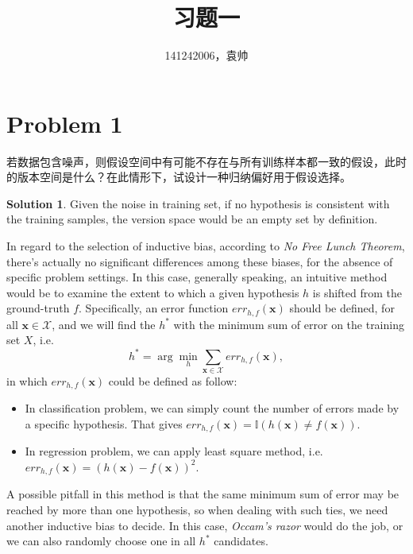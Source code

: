 \documentclass[a4paper,UTF8]{article}
\theoremstyle{definition}
\newtheorem*{solution}{Solution}
\begin{document}
\title{习题一}
\author{141242006，袁帅}
\maketitle


\section*{Problem 1}
若数据包含噪声，则假设空间中有可能不存在与所有训练样本都一致的假设，此时的版本空间是什么？在此情形下，试设计一种归纳偏好用于假设选择。
\begin{solution}
Given the noise in training set, if no hypothesis is consistent with the training samples, the version space would be an empty set by definition.

In regard to the selection of inductive bias, according to \textit{No Free Lunch Theorem}, there's actually no significant differences among these biases, for the absence of specific problem settings. In this case, generally speaking, an intuitive method would be to examine the extent to which a given hypothesis $h$ is shifted from the ground-truth $f$. Specifically, an error function $err_{h,f}(\bm{x})$ should be defined, for all $\bm{x}\in\mathcal{X}$, and we will find the $h^*$ with the minimum sum of error on the training set $X$, i.e. 
\begin{equation}
h^*=\arg\min_{h}\sum_{\bm{x}\in\mathcal{X}}err_{h,f}(\bm{x}),
\end{equation}
in which $err_{h,f}(\bm{x})$ could be defined as follow:

\begin{itemize}
\item{In classification problem, we can simply count the number of errors made by a specific hypothesis. That gives $err_{h,f}(\bm{x})=\mathbb{I}(h(\bm{x})\neq f(\bm{x}))$.}
\item{In regression problem, we can apply least square method, i.e. $err_{h,f}(\bm{x})=(h(\bm{x})-f(\bm{x}))^2$.}
\end{itemize}

A possible pitfall in this method is that the same minimum sum of error may be reached by more than one hypothesis, so when dealing with such ties, we need another inductive bias to decide. In this case, \textit{Occam's razor} would do the job, or we can also randomly choose one in all $h^*$ candidates.

~\\
~\\
\end{solution}
\end{document}
